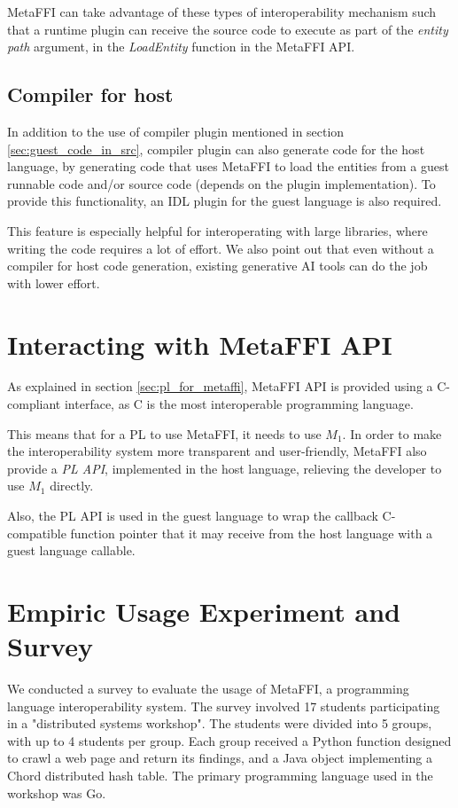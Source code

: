 \documentclass[sigplan,10pt,manuscript,nonacm]{acmart}
\begin{document}
MetaFFI can take advantage of these types of interoperability mechanism such that a runtime plugin can receive the source code to execute as part of the \textit{entity path} argument, in the \textit{LoadEntity} function in the MetaFFI API.

\subsection{Compiler for host}
In addition to the use of compiler plugin mentioned in section \ref{sec:guest_code_in_src}, compiler plugin can also generate code for the host language, by generating code that uses MetaFFI to load the entities from a guest runnable code and/or source code (depends on the plugin implementation). To provide this functionality, an IDL plugin for the guest language is also required.

This feature is especially helpful for interoperating with large libraries, where writing the code requires a lot of effort. We also point out that even without a compiler for host code generation, existing generative AI tools can do the job with lower effort.

\section{Interacting with MetaFFI API} \label{sec:pl_api}

As explained in section \ref{sec:pl_for_metaffi}, MetaFFI API is provided using a C-compliant interface, as C is the most interoperable programming language.

This means that for a PL to use MetaFFI, it needs to use $M_1$. In order to make the interoperability system more transparent and user-friendly, MetaFFI also provide a \textit{PL API}, implemented in the host language, relieving the developer to use $M_1$ directly.

Also, the PL API is used in the guest language to wrap the callback C-compatible function pointer that it may receive from the host language with a guest language callable.

\section{Empiric Usage Experiment and Survey} \label{sec:survey}

We conducted a survey to evaluate the usage of MetaFFI, a programming language interoperability system. The survey involved 17 students participating in a "distributed systems workshop". The students were divided into 5 groups, with up to 4 students per group. Each group received a Python function designed to crawl a web page and return its findings, and a Java object implementing a Chord distributed hash table. The primary programming language used in the workshop was Go.
\end{document}
